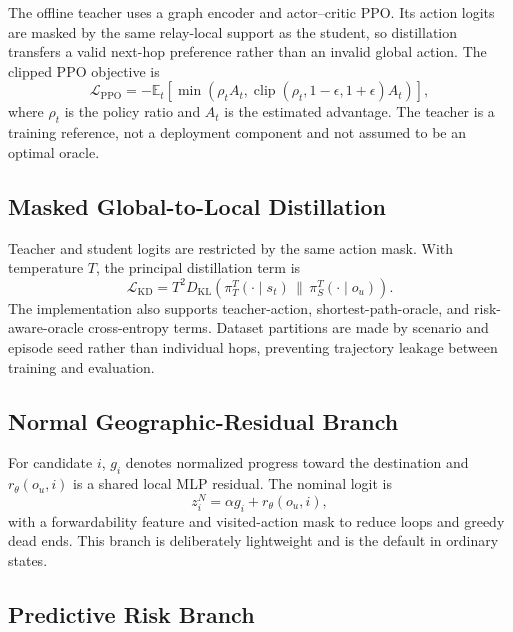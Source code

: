 \documentclass[drones,article,submit,moreauthors]{Definitions/mdpi}
\begin{document}
The offline teacher uses a graph encoder and actor--critic PPO. Its action logits are masked by the same relay-local support as the student, so distillation transfers a valid next-hop preference rather than an invalid global action. The clipped PPO objective is
\begin{equation}
\mathcal{L}_{\mathrm{PPO}}=-\mathbb{E}_t\left[\min\left(\rho_t A_t,\operatorname{clip}(\rho_t,1-\epsilon,1+\epsilon)A_t\right)\right],
\label{eq:ppo}
\end{equation}
where $\rho_t$ is the policy ratio and $A_t$ is the estimated advantage. The teacher is a training reference, not a deployment component and not assumed to be an optimal oracle.

\subsection{Masked Global-to-Local Distillation}

Teacher and student logits are restricted by the same action mask. With temperature $T$, the principal distillation term is
\begin{equation}
\mathcal{L}_{\mathrm{KD}}=T^2D_{\mathrm{KL}}\left(\pi_T^T(\cdot\mid s_t)\,\|\,\pi_S^T(\cdot\mid o_u)\right).
\label{eq:kd}
\end{equation}
The implementation also supports teacher-action, shortest-path-oracle, and risk-aware-oracle cross-entropy terms. Dataset partitions are made by scenario and episode seed rather than individual hops, preventing trajectory leakage between training and evaluation.

\subsection{Normal Geographic-Residual Branch}

For candidate $i$, $g_i$ denotes normalized progress toward the destination and $r_\theta(o_u,i)$ is a shared local MLP residual. The nominal logit is
\begin{equation}
z_i^N=\alpha g_i+r_\theta(o_u,i),
\label{eq:normal}
\end{equation}
with a forwardability feature and visited-action mask to reduce loops and greedy dead ends. This branch is deliberately lightweight and is the default in ordinary states.

\subsection{Predictive Risk Branch}
\end{document}
